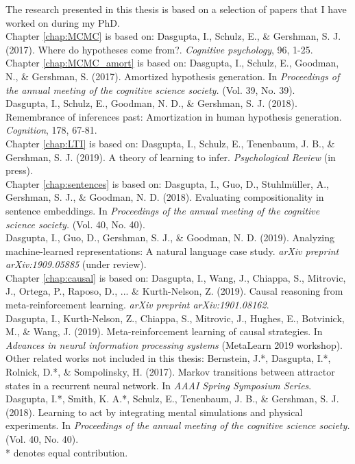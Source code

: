 
{\setlength{\parindent}{0em}
The research presented in this thesis is based on a selection of papers that I have worked on during my PhD.\\

Chapter \ref{chap:MCMC} is based on: Dasgupta, I., Schulz, E., \& Gershman, S. J. (2017). Where do hypotheses come from?. \textit{Cognitive psychology}, 96, 1-25.\\


Chapter \ref{chap:MCMC_amort} is based on:  Dasgupta, I., Schulz, E., Goodman, N., \& Gershman, S. (2017). Amortized hypothesis generation.  In \textit{Proceedings of the annual meeting of the cognitive science society.} (Vol. 39, No. 39).\\ Dasgupta, I., Schulz, E., Goodman, N. D., \& Gershman, S. J. (2018). Remembrance of inferences past: Amortization in human hypothesis generation. \textit{Cognition}, 178, 67-81.\\


Chapter \ref{chap:LTI} is based on: Dasgupta, I., Schulz, E., Tenenbaum, J. B., \& Gershman, S. J. (2019). A theory of learning to infer.  \textit{Psychological Review} (in press).\\


Chapter \ref{chap:sentences} is based on: Dasgupta, I., Guo, D., Stuhlmüller, A., Gershman, S. J., \& Goodman, N. D. (2018). Evaluating compositionality in sentence embeddings. In \textit{Proceedings of the annual meeting of the cognitive science society.} (Vol. 40, No. 40). \\ Dasgupta, I., Guo, D., Gershman, S. J., \& Goodman, N. D. (2019). Analyzing machine-learned representations: A natural language case study. \textit{arXiv preprint arXiv:1909.05885} (under review).\\


Chapter \ref{chap:causal} is based on: Dasgupta, I., Wang, J., Chiappa, S., Mitrovic, J., Ortega, P., Raposo, D., ... \& Kurth-Nelson, Z. (2019). Causal reasoning from meta-reinforcement learning. \textit{arXiv preprint arXiv:1901.08162}. \\ Dasgupta, I., Kurth-Nelson, Z., Chiappa, S., Mitrovic, J., Hughes, E., Botvinick, M., \& Wang, J. (2019). Meta-reinforcement learning of causal strategies.  In \textit{Advances in neural information processing systems} (MetaLearn 2019 workshop).\\


Other related works not included in this thesis: Bernstein, J.*, Dasgupta, I.*, Rolnick, D.*, \& Sompolinsky, H. (2017). Markov transitions between attractor states in a recurrent neural network. In \textit{AAAI Spring Symposium Series}. \\ Dasgupta, I.*, Smith, K. A.*, Schulz, E., Tenenbaum, J. B., \& Gershman, S. J. (2018). Learning to act by integrating mental simulations and physical experiments.  In \textit{Proceedings of the annual meeting of the cognitive science society.} (Vol. 40, No. 40).\\
* denotes equal contribution.
}